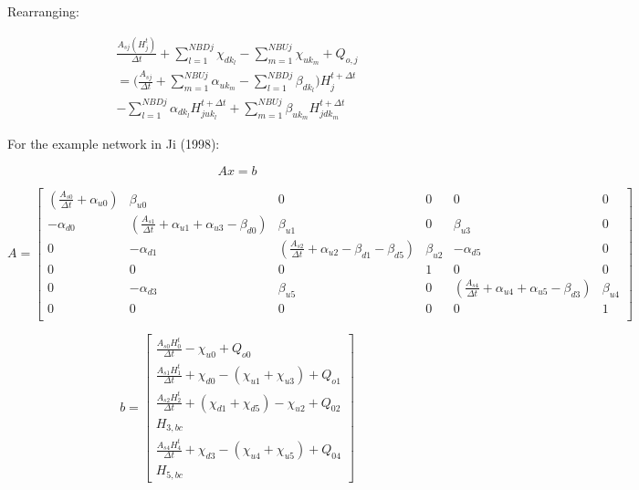 \documentclass[11pt]{article}
\begin{document}
Rearranging:

\begin{equation}
  \begin{split}
    \frac{A_{sj} (H_j^t)}{\Delta t} + \sum_{l=1}^{NBDj} \chi_{dk_l} - \sum_{m=1}^{NBUj} \chi_{uk_m} + Q_{o,j} \\
    =
    \biggl( \frac{A_{sj}}{\Delta t} + \sum_{m=1}^{NBUj} \alpha_{uk_m} - \sum_{l=1}^{NBDj} \beta_{dk_l} \biggr) H_j^{t + \Delta t} \\
    - \sum_{l=1}^{NBDj} \alpha_{dk_l} H_{juk_l}^{t + \Delta t} + \sum_{m=1}^{NBUj} \beta_{uk_m} H_{jdk_m}^{t + \Delta t}
  \end{split}
\end{equation}

For the example network in Ji (1998):

\begin{equation}
  A x = b
\end{equation}

\begin{equation}
  A = 
  \begin{bmatrix}
   ( \frac{A_{s0}}{\Delta t} + \alpha_{u0} ) & \beta_{u0} & 0 & 0 & 0 & 0 \\ 
   - \alpha_{d0} & ( \frac{A_{s1}}{\Delta t} + \alpha_{u1} + \alpha_{u3} - \beta_{d0} ) & \beta_{u1} & 0 & \beta_{u3} & 0 \\
   0 & - \alpha_{d1} & ( \frac{A_{s2}}{\Delta t} + \alpha_{u2} - \beta_{d1} - \beta_{d5} ) & \beta_{u2} & - \alpha_{d5} & 0 \\
   0 & 0 & 0 & 1 & 0 & 0 \\
   0 & - \alpha_{d3} & \beta_{u5} & 0 & ( \frac{A_{s4}}{\Delta t} + \alpha_{u4} + \alpha_{u5} - \beta_{d3} ) & \beta_{u4} \\
   0 & 0 & 0 & 0 & 0 & 1 \\
  \end{bmatrix}
\end{equation}

\begin{equation}
  b = 
  \begin{bmatrix}
    \frac{A_{s0} H_0^t}{\Delta t} - \chi_{u0} + Q_{o0} \\
    \frac{A_{s1} H_1^t}{\Delta t} + \chi_{d0} - (\chi_{u1} + \chi_{u3}) + Q_{o1} \\
    \frac{A_{s2} H_2^t}{\Delta t} + (\chi_{d1} + \chi_{d5}) - \chi_{u2} + Q_{02} \\
    H_{3,bc} \\
    \frac{A_{s4} H_4^t}{\Delta t} + \chi_{d3} - (\chi_{u4} + \chi_{u5}) + Q_{04} \\
    H_{5,bc}
  \end{bmatrix}
\end{equation}
\end{document}
